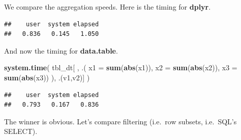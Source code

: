 \documentclass[]{book}
\newenvironment{Shaded}{\begin{snugshade}}{\end{snugshade}}
\newcommand{\DataTypeTok}[1]{\textcolor[rgb]{0.13,0.29,0.53}{#1}}
\newcommand{\KeywordTok}[1]{\textcolor[rgb]{0.13,0.29,0.53}{\textbf{#1}}}
\newcommand{\NormalTok}[1]{#1}
\newcommand{\OperatorTok}[1]{\textcolor[rgb]{0.81,0.36,0.00}{\textbf{#1}}}
\newcommand{\StringTok}[1]{\textcolor[rgb]{0.31,0.60,0.02}{#1}}
\theoremstyle{definition}
\theoremstyle{definition}
\theoremstyle{definition}
\theoremstyle{remark}
\begin{document}
We compare the aggregation speeds.
Here is the timing for \textbf{dplyr}.

\begin{Shaded}
\end{Shaded}

\begin{verbatim}
##    user  system elapsed 
##   0.836   0.145   1.050
\end{verbatim}

And now the timing for \textbf{data.table}.

\begin{Shaded}
\begin{Highlighting}[]
\KeywordTok{system.time}\NormalTok{( }
\NormalTok{  tbl_dt[ ,  .( }\DataTypeTok{x1 =} \KeywordTok{sum}\NormalTok{(}\KeywordTok{abs}\NormalTok{(x1)), }\DataTypeTok{x2 =} \KeywordTok{sum}\NormalTok{(}\KeywordTok{abs}\NormalTok{(x2)), }\DataTypeTok{x3 =} \KeywordTok{sum}\NormalTok{(}\KeywordTok{abs}\NormalTok{(x3)) ), .(v1,v2)]}
\NormalTok{  )}
\end{Highlighting}
\end{Shaded}

\begin{verbatim}
##    user  system elapsed 
##   0.793   0.167   0.836
\end{verbatim}

The winner is obvious.
Let's compare filtering (i.e.~row subsets, i.e.~SQL's SELECT).

\begin{Shaded}
\end{Shaded}
\end{document}
